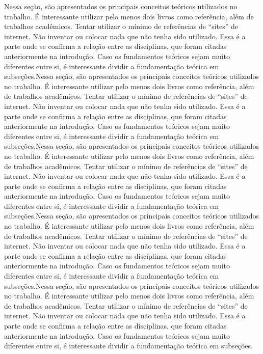 \documentclass{article}
\begin{document}
Nessa seção, são apresentados os principais conceitos teóricos utilizados no trabalho. É interessante utilizar pelo menos dois livros como referência, além de trabalhos acadêmicos. Tentar utilizar o mínimo de referências de “sites” de internet. Não inventar ou colocar nada que não tenha sido utilizado. Essa é a parte onde se confirma a relação entre as disciplinas, que foram citadas anteriormente na introdução. Caso os fundamentos teóricos sejam muito diferentes entre si, é interessante dividir a fundamentação teórica em subseções.Nessa seção, são apresentados os principais conceitos teóricos utilizados no trabalho. É interessante utilizar pelo menos dois livros como referência, além de trabalhos acadêmicos. Tentar utilizar o mínimo de referências de “sites” de internet. Não inventar ou colocar nada que não tenha sido utilizado. Essa é a parte onde se confirma a relação entre as disciplinas, que foram citadas anteriormente na introdução. Caso os fundamentos teóricos sejam muito diferentes entre si, é interessante dividir a fundamentação teórica em subseções.Nessa seção, são apresentados os principais conceitos teóricos utilizados no trabalho. É interessante utilizar pelo menos dois livros como referência, além de trabalhos acadêmicos. Tentar utilizar o mínimo de referências de “sites” de internet. Não inventar ou colocar nada que não tenha sido utilizado. Essa é a parte onde se confirma a relação entre as disciplinas, que foram citadas anteriormente na introdução. Caso os fundamentos teóricos sejam muito diferentes entre si, é interessante dividir a fundamentação teórica em subseções.Nessa seção, são apresentados os principais conceitos teóricos utilizados no trabalho. É interessante utilizar pelo menos dois livros como referência, além de trabalhos acadêmicos. Tentar utilizar o mínimo de referências de “sites” de internet. Não inventar ou colocar nada que não tenha sido utilizado. Essa é a parte onde se confirma a relação entre as disciplinas, que foram citadas anteriormente na introdução. Caso os fundamentos teóricos sejam muito diferentes entre si, é interessante dividir a fundamentação teórica em subseções.Nessa seção, são apresentados os principais conceitos teóricos utilizados no trabalho. É interessante utilizar pelo menos dois livros como referência, além de trabalhos acadêmicos. Tentar utilizar o mínimo de referências de “sites” de internet. Não inventar ou colocar nada que não tenha sido utilizado. Essa é a parte onde se confirma a relação entre as disciplinas, que foram citadas anteriormente na introdução. Caso os fundamentos teóricos sejam muito diferentes entre si, é interessante dividir a fundamentação teórica em subseções.
\end{document}
